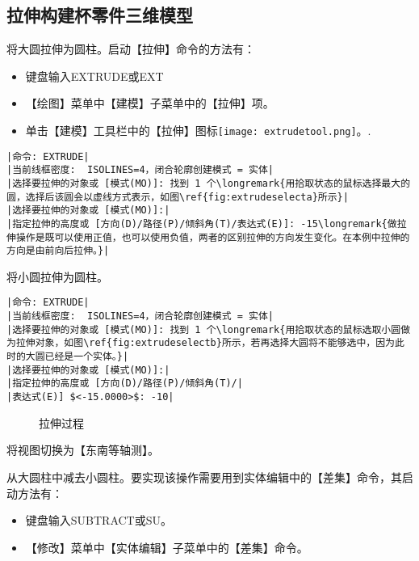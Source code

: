 \subsection{拉伸构建杯零件三维模型}
\begin{procedure}
\item 将大圆拉伸为圆柱。启动【拉伸】命令的方法有：
\begin{itemize}
\item 键盘输入EXTRUDE或EXT
\item 【绘图】菜单中【建模】子菜单中的【拉伸】项。
\item 单击【建模】工具栏中的【拉伸】图标\texttt{[image: extrudetool.png]}。.
\end{itemize}
\begin{lstlisting}
|命令: EXTRUDE|
|当前线框密度:  ISOLINES=4，闭合轮廓创建模式 = 实体|
|选择要拉伸的对象或 [模式(MO)]: 找到 1 个\longremark{用拾取状态的鼠标选择最大的圆，选择后该圆会以虚线方式表示，如图\ref{fig:extrudeselecta}所示}|
|选择要拉伸的对象或 [模式(MO)]:|
|指定拉伸的高度或 [方向(D)/路径(P)/倾斜角(T)/表达式(E)]: -15\longremark{做拉伸操作是既可以使用正值，也可以使用负值，两者的区别拉伸的方向发生变化。在本例中拉伸的方向是由前向后拉伸。}|
\end{lstlisting}
\item 将小圆拉伸为圆柱。
\begin{lstlisting}
|命令: EXTRUDE|
|当前线框密度:  ISOLINES=4，闭合轮廓创建模式 = 实体|
|选择要拉伸的对象或 [模式(MO)]: 找到 1 个\longremark{用拾取状态的鼠标选取小圆做为拉伸对象，如图\ref{fig:extrudeselectb}所示，若再选择大圆将不能够选中，因为此时的大圆已经是一个实体。}|
|选择要拉伸的对象或 [模式(MO)]:|
|指定拉伸的高度或 [方向(D)/路径(P)/倾斜角(T)/|
|表达式(E)] $<-15.0000>$: -10|
\end{lstlisting}
\begin{figure}[htbp]
\centering
{}\hspace{20pt}
\caption{拉伸过程}
\end{figure}
\showremarks
\item 将视图切换为【东南等轴测】。
\item 从大圆柱中减去小圆柱。要实现该操作需要用到实体编辑中的【差集】命令，其启动方法有：
\begin{itemize}
\item 键盘输入SUBTRACT或SU。
\item 【修改】菜单中【实体编辑】子菜单中的【差集】命令。

\end{itemize}
\end{procedure}
